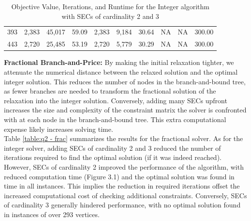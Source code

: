 \documentclass[12pt]{article}
\numberwithin{equation}{section}
\begin{document}
\begin{table}[!ht]
\begin{tabular}{|c|c|c|c|c|c|c|c|c|c|}
     393 &                2,383 &                45,017 &                 59.09 &               2,383 &                9,184 &                30.64 &                   NA &                    NA &               300.00 \\
     443 &                2,720 &                25,485 &                 53.19 &               2,720 &                5,779 &                30.29 &                   NA &                    NA &               300.00 \\
\hline
\end{tabular}
\caption{Objective Value, Iterations, and Runtime for the Integer algorithm with SECs of cardinality 2 and 3}
\label{table:q2 - int}
\end{table}

\vspace{1em} 

\noindent\textbf{Fractional Branch-and-Price:} By making the initial relaxation tighter, we attenuate the numerical distance between the relaxed solution and the optimal integer solution. This reduces the number of nodes in the branch-and-bound tree, as fewer branches are needed to transform the fractional solution of the relaxation into the integer solution. Conversely, adding many SECs upfront increases the size and complexity of the constraint matrix the solver is confronted with at each node in the branch-and-bound tree. This extra computational expense likely increases solving time. \\

\noindent Table \ref{table:q2 - frac} summarizes the results for the fractional solver. As for the integer solver, adding SECs of cardinality 2 and 3 reduced the number of iterations required to find the optimal solution (if it was indeed reached). However, SECs of cardinality 2 improved the performance of the algorithm, with reduced computation time (Figure 3.1) and the optimal solution was found in time in all instances. This implies the reduction in required iterations offset the increased computational cost of checking additional constraints. Conversely, SECs of cardinality 3 generally hindered performance, with no optimal solution found in instances of over 293 vertices.
\end{document}
